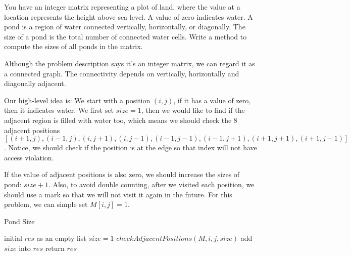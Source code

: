 \newpage
{} %

\problemdes

You have an integer matrix representing a plot of land, where the value at a location represents the height above sea level. A value of zero indicates water. A pond is a region of water connected vertically, horizontally, or diagonally. The size of a pond is the total number of connected water cells. Write a method to compute the sizes of all ponds in the matrix.

\solution


Although the problem description says it's an integer matrix, we can regard it as a connected graph. The connectivity depends on vertically, horizontally and diagonally adjacent. 

Our high-level idea is: We start with a position $(i, j)$, if it has a value of zero, then it indicates water. We first set $size=1$, then we would like to find if the adjacent region is filled with water too, which means we should check the 8 adjacent positions $[(i+1, j), (i-1, j), (i, j+1), (i, j-1), (i-1, j-1), (i-1, j+1), (i+1, j+1), (i+1, j-1)]$. Notice, we should check if the position is at the edge so that index will not have access violation. 

If the value of adjacent positions is also zero, we should increase the sizes of pond: $size+1$. Also, to avoid double counting, after we visited each position, we should use a mark so that we will not visit it again in the future. For this problem, we can simple set $M[i, j] = 1$. 


\begin{algorithm}[]
  \caption{Pond Size}
  initial $res$ as an empty list \;
  {
    {
        {
            $size = 1$ \;
            $checkAdjacentPositions(M, i, j, size)$ \;
            add $size$ into $res$ \;
        }
    }
  }
  return $res$\;
\end{algorithm}

